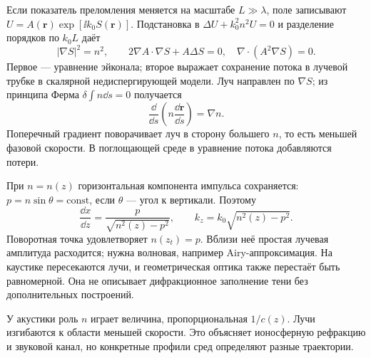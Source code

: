 
Если показатель преломления меняется на масштабе $L\gg\lambda$, поле записывают $U=A(\bm r)\exp[\ii k_0S(\bm r)]$. Подстановка в $\Delta U+k_0^2n^2U=0$ и разделение порядков по $k_0L$ даёт
\begin{equation}
 |\nabla S|^2=n^2,\qquad
 2\nabla A\cdot\nabla S+A\Delta S=0,
 \quad\nabla\cdot(A^2\nabla S)=0.
\end{equation}
Первое — уравнение эйконала; второе выражает сохранение потока в лучевой трубке в скалярной недиспергирующей модели. Луч направлен по $\nabla S$; из принципа Ферма $\delta\int n\dd s=0$ получается
\begin{equation}\label{eq:rayequation}
 \frac{\dd}{\dd s}\left(n\frac{\dd\bm r}{\dd s}\right)=\nabla n.
\end{equation}
Поперечный градиент поворачивает луч в сторону большего $n$, то есть меньшей фазовой скорости. В поглощающей среде в уравнение потока добавляются потери.

При $n=n(z)$ горизонтальная компонента импульса сохраняется: $p=n\sin\theta=\mathrm{const}$, если $\theta$ — угол к вертикали. Поэтому
\begin{equation}
 \frac{\dd x}{\dd z}=\frac{p}{\sqrt{n^2(z)-p^2}},\qquad
 k_z=k_0\sqrt{n^2(z)-p^2}.
\end{equation}
Поворотная точка удовлетворяет $n(z_t)=p$. Вблизи неё простая лучевая амплитуда расходится; нужна волновая, например Airy-аппроксимация. На каустике пересекаются лучи, и геометрическая оптика также перестаёт быть равномерной. Она не описывает дифракционное заполнение тени без дополнительных построений.

У акустики роль $n$ играет величина, пропорциональная $1/c(z)$. Лучи изгибаются к области меньшей скорости. Это объясняет ионосферную рефракцию и звуковой канал, но конкретные профили сред определяют разные траектории.
